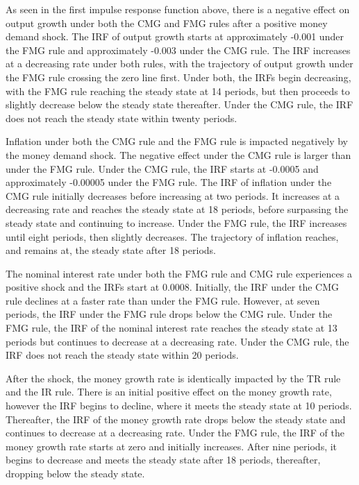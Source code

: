 \documentclass[11pt,preprint, authoryear]{elsarticle}
\numberwithin{equation}{section}
\numberwithin{figure}{section}
\numberwithin{table}{section}
\begin{document}
As seen in the first impulse response function above, there is a
negative effect on output growth under both the CMG and FMG rules after
a positive money demand shock. The IRF of output growth starts at
approximately -0.001 under the FMG rule and approximately -0.003 under
the CMG rule. The IRF increases at a decreasing rate under both rules,
with the trajectory of output growth under the FMG rule crossing the
zero line first. Under both, the IRFs begin decreasing, with the FMG
rule reaching the steady state at 14 periods, but then proceeds to
slightly decrease below the steady state thereafter. Under the CMG rule,
the IRF does not reach the steady state within twenty periods.

Inflation under both the CMG rule and the FMG rule is impacted
negatively by the money demand shock. The negative effect under the CMG
rule is larger than under the FMG rule. Under the CMG rule, the IRF
starts at -0.0005 and approximately -0.00005 under the FMG rule. The IRF
of inflation under the CMG rule initially decreases before increasing at
two periods. It increases at a decreasing rate and reaches the steady
state at 18 periods, before surpassing the steady state and continuing
to increase. Under the FMG rule, the IRF increases until eight periods,
then slightly decreases. The trajectory of inflation reaches, and
remains at, the steady state after 18 periods.

The nominal interest rate under both the FMG rule and CMG rule
experiences a positive shock and the IRFs start at 0.0008. Initially,
the IRF under the CMG rule declines at a faster rate than under the FMG
rule. However, at seven periods, the IRF under the FMG rule drops below
the CMG rule. Under the FMG rule, the IRF of the nominal interest rate
reaches the steady state at 13 periods but continues to decrease at a
decreasing rate. Under the CMG rule, the IRF does not reach the steady
state within 20 periods.

After the shock, the money growth rate is identically impacted by the TR
rule and the IR rule. There is an initial positive effect on the money
growth rate, however the IRF begins to decline, where it meets the
steady state at 10 periods. Thereafter, the IRF of the money growth rate
drops below the steady state and continues to decrease at a decreasing
rate. Under the FMG rule, the IRF of the money growth rate starts at
zero and initially increases. After nine periods, it begins to decrease
and meets the steady state after 18 periods, thereafter, dropping below
the steady state.
\end{document}
